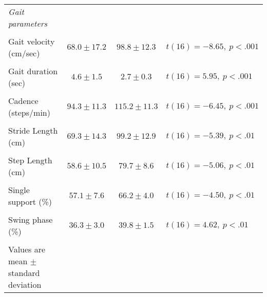 \begin{table}[ht]
\begin{tabular}{lccl}
\emph{Gait parameters}  &  &  &  \\ \\
\hspace{0.3cm} Gait velocity (cm/sec)  & $68.0 \pm 17.2$ & $98.8 \pm 12.3$ & $t(16) =-8.65,~p < .001$ \\ \\  
\hspace{0.3cm} Gait duration (sec)  & $4.6 \pm 1.5$ & $2.7 \pm 0.3$ & $t(16)=5.95,~p < .001$ \\ \\
\hspace{0.3cm} Cadence (steps/min)  & $94.3 \pm 11.3$ & $115.2 \pm 11.3$ & $t(16)=-6.45, ~p < .001$ \\ \\
\hspace{0.3cm} Stride Length (cm)  & $69.3 \pm 14.3$ & $99.2 \pm 12.9$ & $t(16)=-5.39, ~p < .01$ \\ \\
\hspace{0.3cm} Step Length (cm)  & $58.6 \pm 10.5$ & $79.7 \pm 8.6$ & $t(16)=-5.06,~p < .01$ \\ \\
\hspace{0.3cm} Single support (\%)  & $57.1 \pm 7.6$ & $66.2 \pm 4.0$ & $t(16)=-4.50,~p < .01$ \\ \\
\hspace{0.3cm} Swing phase (\%)  & $36.3 \pm 3.0$ & $39.8 \pm 1.5$ & $t(16)=4.62,~p < .01$ \\ \\
\hline
Values are mean $\pm$ standard deviation\\
\end{tabular}
\label{tab:gait}
\end{table}